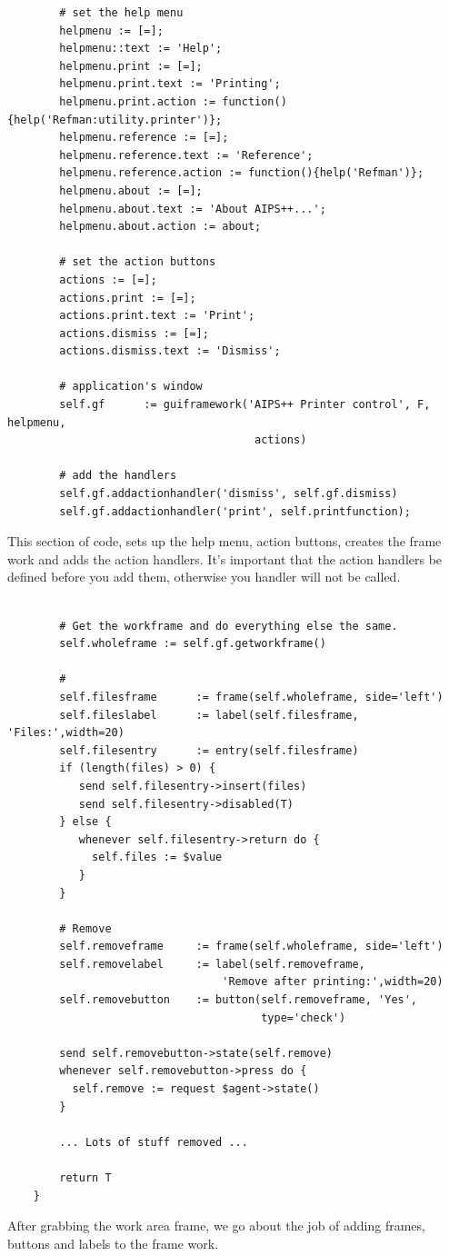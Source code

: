 \begin{verbatim}
        # set the help menu
        helpmenu := [=];
        helpmenu::text := 'Help';
        helpmenu.print := [=];
        helpmenu.print.text := 'Printing';
        helpmenu.print.action := function(){help('Refman:utility.printer')};
        helpmenu.reference := [=];
        helpmenu.reference.text := 'Reference';
        helpmenu.reference.action := function(){help('Refman')};
        helpmenu.about := [=];
        helpmenu.about.text := 'About AIPS++...';
        helpmenu.about.action := about;
 
        # set the action buttons
        actions := [=];
        actions.print := [=];
        actions.print.text := 'Print';
        actions.dismiss := [=];
        actions.dismiss.text := 'Dismiss';
 
        # application's window
        self.gf      := guiframework('AIPS++ Printer control', F, helpmenu,
                                      actions)
 
        # add the handlers
        self.gf.addactionhandler('dismiss', self.gf.dismiss)
        self.gf.addactionhandler('print', self.printfunction);

\end{verbatim}
This section of code, sets up the help menu, action buttons, creates the
frame work and adds the action handlers. It's important that the action 
handlers be defined before you add them, otherwise you handler will not be
called.

\begin{verbatim}

        # Get the workframe and do everything else the same.
        self.wholeframe := self.gf.getworkframe()
 
        #
        self.filesframe      := frame(self.wholeframe, side='left')
        self.fileslabel      := label(self.filesframe, 'Files:',width=20)
        self.filesentry      := entry(self.filesframe)
        if (length(files) > 0) {
           send self.filesentry->insert(files)
           send self.filesentry->disabled(T)
        } else {
           whenever self.filesentry->return do {
             self.files := $value
           }
        }
 
        # Remove
        self.removeframe     := frame(self.wholeframe, side='left')
        self.removelabel     := label(self.removeframe,
                                 'Remove after printing:',width=20)
        self.removebutton    := button(self.removeframe, 'Yes',
                                       type='check')
 
        send self.removebutton->state(self.remove)
        whenever self.removebutton->press do {
          self.remove := request $agent->state()
        }
 
        ... Lots of stuff removed ...

        return T
    }

\end{verbatim}
After grabbing the work area frame, we go about the job of adding frames, 
buttons and labels to the frame work.

